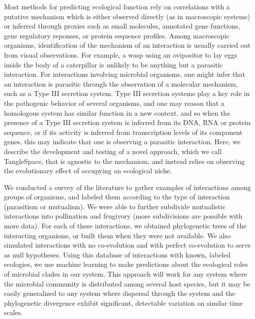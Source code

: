Most methods for predicting ecological function rely on correlations with a putative mechanism which is either observed directly (as in macroscopic systems) or inferred through proxies such as small molecules, \cite{larsen2015predicting, sardans2011ecological, bundy2009environmental} annotated gene functions, \cite{jiang2012functional, bik2014deciphering} gene regulatory reponses, \cite{mason2012metagenome, urich2008simultaneous, gifford2013expression} or protein sequence profiles. \cite{wang2016environmental} Among macroscopic organisms, identification of the mechanism of an interaction is usually carried out from visual observations. For example, a wasp using an ovipositor to lay eggs inside the body of a caterpillar is unlikely to be anything but a parasitic interaction. For interactions involving microbial organisms, one might infer that an interaction is parasitic through the observation of a molecular mechanism, such as a Type III secretion system. Type III secretion systems play a key role in the pathogenic behavior of several organisms, and one may reason that a homologous system has similar function in a new context, and so when the presence of a Type III secretion system is inferred from its DNA, RNA or protein sequence, or if its activity is inferred from transcription levels of its component genes, this may indicate that one is observing a parasitic interaction. Here, we describe the development and testing of a novel approach, which we call TangleSpace, that is agnostic to the mechanism, and instead relies on observing the evolutionary effect of occupying an ecological niche.

We conducted a survey of the literature to gather examples of interactions among groups of organisms, and labeled them according to the type of interaction (parasitism or mutualism). We were able to further subdivide mutualistic interactions into pollination and frugivory (more subdivisions are possible with more data). For each of these interactions, we obtained phylogenetic trees of the interacting organisms, or built them when they were not available. We also simulated interactions with no co-evolution and with perfect co-evolution to serve as null hypotheses. Using this database of interactions with known, labeled ecologies, we use machine learning to make predictions about the ecological roles of microbial clades in our system. This approach will work for any system where the microbial community is distributed among several host species, but it may be easily generalized to any system where dispersal through the system and the phylogenetic divergence exhibit significant, detectable variation on similar time scales.

